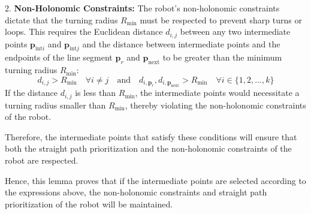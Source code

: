 \vspace*{6mm}  

2. \textbf{Non-Holonomic Constraints:}
The robot's non-holonomic constraints dictate that the turning radius $R_{\min}$ must be respected to prevent sharp turns or loops. This requires the Euclidean distance $d_{i,j}$ between any two intermediate points $\mathbf{p}_{\text{int}i}$ and $\mathbf{p}_{\text{int}j}$ and the distance between intermediate points and the endpoints of the line segment $\mathbf{p}_r$ and $\mathbf{p}_{\text{next}}$ to be greater than the minimum turning radius $R_{\min}$:
\[
d_{i,j} > R_{\min} \quad \forall i \neq j \quad \text{and} \quad d_{i,\mathbf{p}_r}, d_{i,\mathbf{p}_{\text{next}}} > R_{\min} \quad \forall i \in \{1, 2, \ldots, k\}
\]
If the distance $d_{i,j}$ is less than $R_{\min}$, the intermediate points would necessitate a turning radius smaller than $R_{\min}$, thereby violating the non-holonomic constraints of the robot.

\vspace*{6mm}  

Therefore, the intermediate points that satisfy these conditions will ensure that both the straight path prioritization and the non-holonomic constraints of the robot are respected.

\vspace*{6mm}  

Hence, this lemma proves that if the intermediate points are selected according to the expressions above, the non-holonomic constraints and straight path prioritization of the robot will be maintained.








